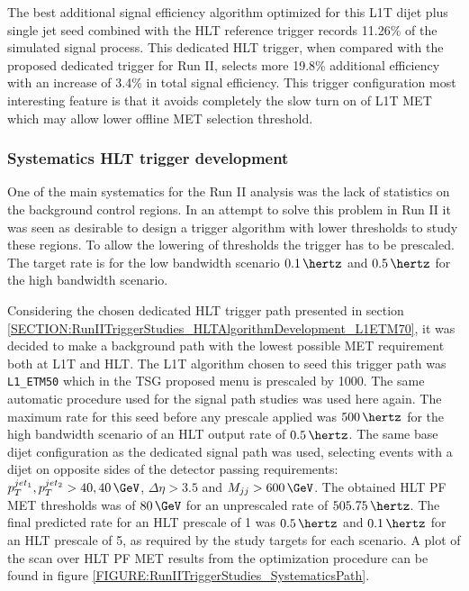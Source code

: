 The best additional signal efficiency algorithm optimized for this \gls{L1T} dijet plus single jet seed combined with the \gls{HLT} reference trigger records 11.26\% of the simulated signal process. This dedicated \gls{HLT} trigger, when compared with the proposed dedicated trigger for Run II, selects more 19.8\% additional efficiency with an increase of 3.4\% in total signal efficiency. This trigger configuration most interesting feature is that it avoids completely the slow turn on of \gls{L1T} \gls{MET} which may allow lower offline \gls{MET} selection threshold.

\subsubsection{Systematics HLT trigger development}
\label{SECTION:RunIITriggerStudies_HLTAlgorithmDevelopment_SystematicsPath}


One of the main systematics for the Run II analysis was the lack of statistics on the background control regions. In an attempt to solve this problem in Run II it was seen as desirable to design a trigger algorithm with lower thresholds to study these regions. To allow the lowering of thresholds the trigger has to be prescaled. The target rate is for the low bandwidth scenario $0.1\,\hertz$ and $0.5\,\hertz$ for the high bandwidth scenario.

Considering the chosen dedicated \gls{HLT} trigger path presented in section \ref{SECTION:RunIITriggerStudies_HLTAlgorithmDevelopment_L1ETM70}, it was decided to make a background path with the lowest possible \gls{MET} requirement both at \gls{L1T} and \gls{HLT}. The \gls{L1T} algorithm chosen to seed this trigger path was \verb|L1_ETM50| which in the \gls{TSG} proposed menu is prescaled by 1000. The same automatic procedure used for the signal path studies was used here again. The maximum rate for this seed before any prescale applied was $500\,\hertz$ for the high bandwidth scenario of an \gls{HLT} output rate of $0.5\,\hertz$. The same base dijet configuration as the dedicated signal path was used, selecting events with a dijet on opposite sides of the detector passing requirements: $p_T^{jet_1},p_T^{jet_2}>40,40\,\GeV$, $\Delta\eta>3.5$ and $M_{jj}>600\,\GeV$. The obtained \gls{HLT} \gls{PF} \gls{MET} thresholds was of $80\,\GeV$ for an unprescaled rate of $505.75\,\hertz$. The final predicted rate for an \gls{HLT} prescale of 1 was $0.5\,\hertz$ and $0.1\,\hertz$ for an \gls{HLT} prescale of 5, as required by the study targets for each scenario. A plot of the scan over \gls{HLT} \gls{PF} \gls{MET} results from the optimization procedure can be found in figure \ref{FIGURE:RunIITriggerStudies_SystematicsPath}.

